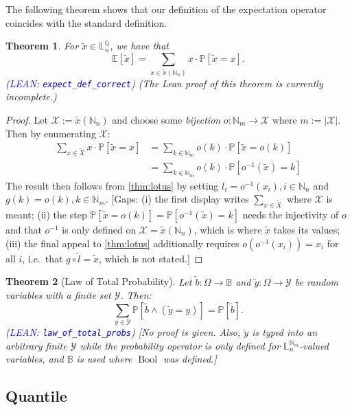 \documentclass[letterpaper]{article}
\theoremstyle{plain}
\newtheorem{theorem}{Theorem}[subsection]
\theoremstyle{definition}
\theoremstyle{remark}
\newcommand{\Nats}{\mathbb{N}}
\newcommand{\E}{\mathbb{E}}
\newcommand{\PP}{\mathbb{P}}
\DeclareMathOperator{\bool}{Bool}
\newcommand{\cc}[1]{\textcolor{ccolor}{[#1]}}
\newcommand{\lean}[1]{\textcolor{blue}{(\emph{LEAN}: \texttt{#1})}}
\newcommand{\leanok}{}
\newcommand{\notready}{}
\begin{document}
The following theorem shows that our definition of the expectation operator coincides with the standard definition. 
\begin{theorem} \label{thm:expect-correct}
  For $\tilde{x}\in \mathbb{L}_n^{\mathbb{Q}}$, we have that
  \[
   \E[\tilde{x}] = \sum_{x \in \tilde{x}(\Nats_n)} x \cdot \PP[\tilde{x} = x].  
  \]
  \lean{expect\_def\_correct} \notready
  (The Lean proof of this theorem is currently incomplete.)
\end{theorem}
\begin{proof}
Let $\mathcal{X} := \tilde{x}(\Nats_n)$ and choose some \emph{bijection} $o \colon \Nats_m \to  \mathcal{X} $ where $m := |\mathcal{X}|$. Then by enumerating $\mathcal{X}$:
  \begin{align*}
    \sum_{x \in \tilde{X}} x \cdot \PP[\tilde{x} = x]
    &= \sum_{k\in \Nats_m} o(k) \cdot \PP[\tilde{x} = o(k)] \\
    &= \sum_{k\in \Nats_m} o(k) \cdot \PP[o^{-1}(\tilde{x}) = k]
  \end{align*}
The result then follows from \cref{thm:lotus} by setting $l_i = o^{-1}(x_i), i\in \Nats_n$ and $g(k) = o(k), k\in \Nats_m$.
\cc{Gaps: (i) the first display writes $\sum_{x\in \tilde{X}}$ where $\mathcal{X}$ is meant; (ii) the step $\PP[\tilde{x}=o(k)] = \PP[o^{-1}(\tilde{x})=k]$ needs the injectivity of $o$ and that $o^{-1}$ is only defined on $\mathcal{X} = \tilde{x}(\Nats_n)$, which is where $\tilde{x}$ takes its values; (iii) the final appeal to \cref{thm:lotus} additionally requires $o(o^{-1}(x_i)) = x_i$ for all $i$, i.e.\ that $g\circ \tilde{l} = \tilde{x}$, which is not stated.}
\end{proof}


\begin{theorem}[Law of Total Probability] \label{thm:total-probability}
Let $\tilde{b} \colon \Omega \to \mathbb{B}$ and $\tilde{y} \colon \Omega \to \mathcal{Y}$ be random variables with a finite set $\mathcal{Y}$. Then:
\[
\sum_{y\in \mathcal{Y}} \PP\left[\tilde{b} \wedge (\tilde{y} = y) \right] = \PP \left[ \tilde{b} \right].
\]
\lean{law\_of\_total\_probs} \leanok
\cc{No proof is given. Also, $\tilde{y}$ is typed into an arbitrary finite $\mathcal{Y}$ while the probability operator is only defined for $\mathbb{L}_n^{\Nats_m}$-valued variables, and $\mathbb{B}$ is used where $\bool$ was defined.}
\end{theorem}

\subsection{Quantile}
\end{document}
